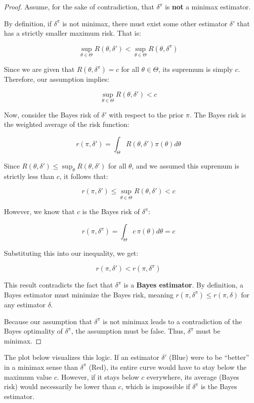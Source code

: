 \documentclass[
  letterpaper,
  DIV=11,
  numbers=noendperiod]{scrreprt}
\renewcommand{\[}{\begin{equation}}
\renewcommand{\]}{\end{equation}}
\theoremstyle{definition}
\theoremstyle{plain}
\theoremstyle{plain}
\theoremstyle{plain}
\theoremstyle{definition}
\theoremstyle{plain}
\theoremstyle{remark}
\begin{document}
\begin{proof}
Assume, for the sake of contradiction, that \(\delta^\pi\) is
\textbf{not} a minimax estimator.

By definition, if \(\delta^\pi\) is not minimax, there must exist some
other estimator \(\delta'\) that has a strictly smaller maximum risk.
That is:

\[
\sup_{\theta \in \Theta} R(\theta, \delta') < \sup_{\theta \in \Theta} R(\theta, \delta^\pi)
\]

Since we are given that \(R(\theta, \delta^\pi) = c\) for all
\(\theta \in \Theta\), its supremum is simply \(c\). Therefore, our
assumption implies:

\[
\sup_{\theta \in \Theta} R(\theta, \delta') < c
\]

Now, consider the Bayes risk of \(\delta'\) with respect to the prior
\(\pi\). The Bayes risk is the weighted average of the risk function:

\[
r(\pi, \delta') = \int_\Theta R(\theta, \delta') \pi(\theta) d\theta
\]

Since \(R(\theta, \delta') \le \sup_{\theta} R(\theta, \delta')\) for
all \(\theta\), and we assumed this supremum is strictly less than
\(c\), it follows that:

\[
r(\pi, \delta') \le \sup_{\theta \in \Theta} R(\theta, \delta') < c
\]

However, we know that \(c\) is the Bayes risk of \(\delta^\pi\):

\[
r(\pi, \delta^\pi) = \int_\Theta c \, \pi(\theta) d\theta = c
\]

Substituting this into our inequality, we get:

\[
r(\pi, \delta') < r(\pi, \delta^\pi)
\]

This result contradicts the fact that \(\delta^\pi\) is a \textbf{Bayes
estimator}. By definition, a Bayes estimator must minimize the Bayes
risk, meaning \(r(\pi, \delta^\pi) \le r(\pi, \delta)\) for any
estimator \(\delta\).

Because our assumption that \(\delta^\pi\) is not minimax leads to a
contradiction of the Bayes optimality of \(\delta^\pi\), the assumption
must be false. Thus, \(\delta^\pi\) must be minimax.
\end{proof}

The plot below visualizes this logic. If an estimator \(\delta'\) (Blue)
were to be ``better'' in a minimax sense than \(\delta^\pi\) (Red), its
entire curve would have to stay below the maximum value \(c\). However,
if it stays below \(c\) everywhere, its average (Bayes risk) would
necessarily be lower than \(c\), which is impossible if \(\delta^\pi\)
is the Bayes estimator.
\end{document}
